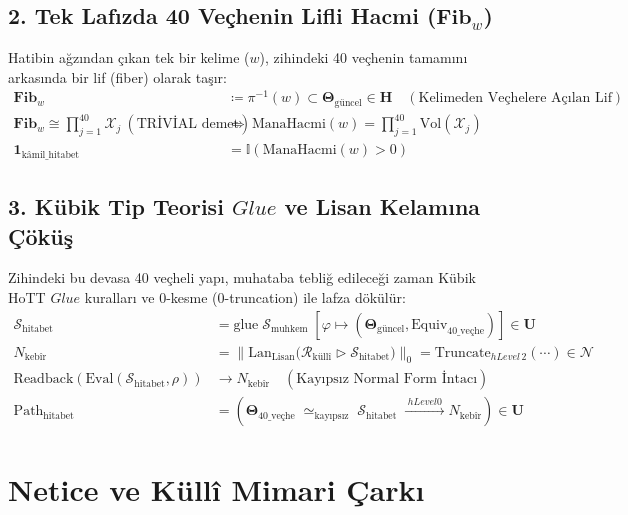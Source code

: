 \documentclass[11pt, a4paper]{article}
\begin{document}
\subsection{2. Tek Lafızda 40 Veçhenin Lifli Hacmi ($\mathbf{Fib}_w$)}
Hatibin ağzından çıkan tek bir kelime ($w$), zihindeki 40 veçhenin tamamını arkasında bir lif (fiber) olarak taşır:
\begin{align}
\mathbf{Fib}_w &\coloneqq \pi^{-1}(w) \subset \mathbf{\Theta}_{\text{güncel}} \in \mathbf{H} \quad (\text{Kelimeden Veçhelere Açılan Lif}) \\
\mathbf{Fib}_w \cong \textstyle\prod_{j=1}^{40} \mathcal{X}_j \ (\text{TRİVİAL demet}) \ &\Rightarrow \ \text{ManaHacmi}(w) = \prod_{j=1}^{40} \text{Vol}(\mathcal{X}_j) \\
\mathbf{1}_{\text{kâmil\_hitabet}} &= \mathbb{I}\left( \text{ManaHacmi}(w) > 0 \right)
\end{align}

\subsection{3. Kübik Tip Teorisi $Glue$ ve Lisan Kelamına Çöküş}
Zihindeki bu devasa 40 veçheli yapı, muhataba tebliğ edileceği zaman Kübik HoTT $Glue$ kuralları ve $0$-kesme ($0$-truncation) ile lafza dökülür:
\begin{align}
\mathcal{S}_{\text{hitabet}} &= \text{glue} \; \mathcal{S}_{\text{muhkem}} \; \left[ \varphi \mapsto (\mathbf{\Theta}_{\text{güncel}}, \text{Equiv}_{\text{40\_veçhe}}) \right] \in \mathbf{U} \\
N_{\text{kebîr}} &= \big\| \text{Lan}_{\text{Lisan}} \big( \mathcal{R}_{\text{küllî}} \triangleright \mathcal{S}_{\text{hitabet}} \big) \big\|_0 = \text{Truncate}_{hLevel\,2}(\cdots) \in \mathcal{N} \\
\text{Readback}\left( \text{Eval}(\mathcal{S}_{\text{hitabet}}, \rho) \right) &\longrightarrow N_{\text{kebîr}} \quad (\text{Kayıpsız Normal Form İntacı}) \\
\text{Path}_{\text{hitabet}} &= \left( \mathbf{\Theta}_{\text{40\_veçhe}} \;\simeq_{\text{kayıpsız}}\; \mathcal{S}_{\text{hitabet}} \;\xrightarrow{\;hLevel 0\;} N_{\text{kebîr}} \right) \in \mathbf{U}
\end{align}

\section{Netice ve Küllî Mimari Çarkı}
\end{document}
